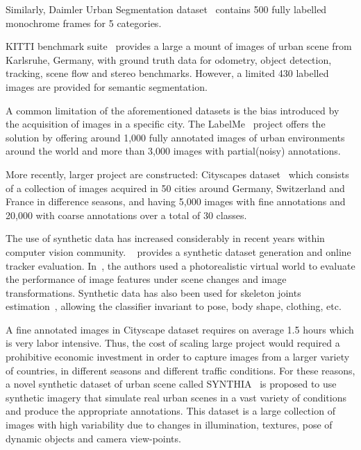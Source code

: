 \documentclass[10pt,twocolumn,letterpaper]{article}
\begin{document}
Similarly, Daimler Urban Segmentation dataset~\cite{scharwachter2013efficient} contains 500 fully labelled monochrome frames for 5 categories.

KITTI benchmark suite~\cite{Geiger2013IJRR} provides a large a mount of images of urban scene from Karlsruhe, Germany, with ground truth data for odometry, object detection, tracking, scene flow and stereo benchmarks. However, a limited 430 labelled images are provided for semantic segmentation.

A common limitation of the aforementioned datasets is the bias introduced by the acquisition of images in a specific city. The LabelMe~\cite{russell2008labelme} project offers the solution by offering around 1,000 fully annotated images of urban environments around the world and more than 3,000 images with partial(noisy) annotations.

More recently, larger project are constructed:
Cityscapes dataset~\cite{Cordts2016Cityscapes} which consists of a collection of images acquired in 50 cities around Germany, Switzerland and France in difference seasons, and having 5,000 images with fine annotations and 20,000 with coarse annotations over a total of 30 classes.

The use of synthetic data has increased considerably in recent years within computer vision community. ~\cite{mueller2016benchmark} provides a synthetic dataset generation and online tracker evaluation. In~\cite{kaneva2011evaluation}, the authors used a photorealistic virtual world to evaluate the performance of image features under scene changes and image transformations. Synthetic data has also been used for skeleton joints estimation~\cite{shotton2013real}, allowing the classifier invariant to pose, body shape, clothing, etc.

A fine annotated images in Cityscape dataset requires on average 1.5 hours which is very labor intensive. Thus, the cost of scaling large project would required a prohibitive economic investment in order to capture images from a larger variety of countries, in different seasons and different traffic conditions. For these reasons, a novel synthetic dataset of urban scene called SYNTHIA~\cite{ros2016synthia} is proposed to use synthetic imagery that simulate real urban scenes in a vast variety of conditions and produce the appropriate annotations.
This dataset is a large collection of images with high variability due to changes in illumination, textures, pose of dynamic objects and camera view-points.

\end{document}

